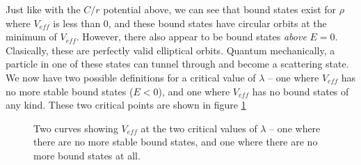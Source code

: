 \documentclass[12pt,twoside]{reedthesis}
\begin{document}
Just like with the $C/r$ potential above, we can see that bound states exist for $\rho$ where $V_{eff}$ is less than 0, and these bound states have circular orbits at the minimum of $V_{eff}$. However, there also appear to be bound states \emph{above} $E = 0$. Clasically, these are perfectly valid elliptical orbits. Quantum mechanically, a particle in one of these states can tunnel through and become a scattering state. We now have two possible definitions for a critical value of $\lambda$ -- one where $V_{eff}$ has no more stable bound states ($E < 0$), and one where $V_{eff}$ has no bound states of any kind. These two critical points are shown in figure \ref{fig:critpoints}

\begin{figure}[h]
\caption[The two critical values of $\lambda$]{Two curves showing $V_{eff}$ at the two critical values of $\lambda$ -- one where there are no more stable bound states, and one where there are no more bound states at all.}
\label{fig:critpoints}
\end{figure}
\end{document}
